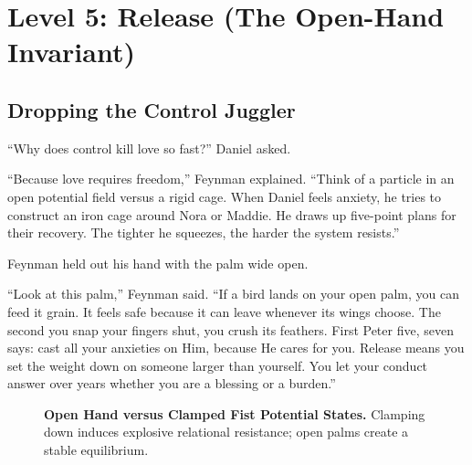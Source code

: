\documentclass[11pt]{report}
\begin{document}
\chapter{Level 5: Release (The Open-Hand Invariant)}

\section{Dropping the Control Juggler}
``Why does control kill love so fast?'' Daniel asked.

``Because love requires freedom,'' Feynman explained. ``Think of a particle in an open potential field versus a rigid cage. When Daniel feels anxiety, he tries to construct an iron cage around Nora or Maddie. He draws up five-point plans for their recovery. The tighter he squeezes, the harder the system resists.''

Feynman held out his hand with the palm wide open.

``Look at this palm,'' Feynman said. ``If a bird lands on your open palm, you can feed it grain. It feels safe because it can leave whenever its wings choose. The second you snap your fingers shut, you crush its feathers. First Peter five, seven says: cast all your anxieties on Him, because He cares for you. Release means you set the weight down on someone larger than yourself. You let your conduct answer over years whether you are a blessing or a burden.''

\begin{figure}[H]
\centering
{}
\caption{\textbf{Open Hand versus Clamped Fist Potential States.} Clamping down induces explosive relational resistance; open palms create a stable equilibrium.}
\label{fig:palms}
\end{figure}
\end{document}

